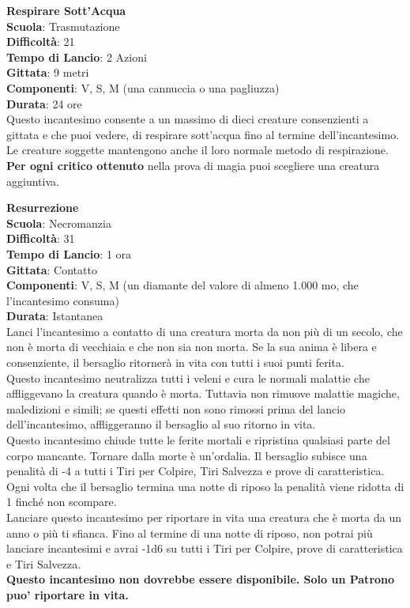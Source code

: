 \begin{multicols}{2}
\medskip\textbf{Respirare Sott'Acqua}\\
\textbf{Scuola}: Trasmutazione\\
\textbf{Difficoltà}: 21\\
\textbf{Tempo di Lancio}: 2 Azioni\\
\textbf{Gittata}: 9 metri\\
\textbf{Componenti}: V, S, M (una cannuccia o una pagliuzza)\\
\textbf{Durata}: 24 ore\\
Questo incantesimo consente a un massimo di dieci creature consenzienti a gittata e che puoi vedere, di respirare sott'acqua fino al termine dell'incantesimo. Le creature soggette mantengono anche il loro normale metodo di respirazione.\\
\textbf{Per ogni critico ottenuto} nella prova di magia puoi scegliere una creatura aggiuntiva.

\medskip\textbf{Resurrezione}\\
\textbf{Scuola}: Necromanzia\\
\textbf{Difficoltà}: 31\\
\textbf{Tempo di Lancio}: 1 ora\\
\textbf{Gittata}: Contatto\\
\textbf{Componenti}: V, S, M (un diamante del valore di almeno 1.000 mo, che l'incantesimo consuma)\\
\textbf{Durata}: Istantanea\\
Lanci l'incantesimo a contatto di una creatura morta da non più di un secolo, che non è morta di vecchiaia e che non sia non morta. Se la sua anima è libera e consenziente, il bersaglio ritornerà in vita con tutti i suoi punti ferita.\\
Questo incantesimo neutralizza tutti i veleni e cura le normali malattie che affliggevano la creatura quando è morta. Tuttavia non rimuove malattie magiche, maledizioni e simili; se questi effetti non sono rimossi prima del lancio dell'incantesimo, affliggeranno il bersaglio al suo ritorno in vita.\\
Questo incantesimo chiude tutte le ferite mortali e ripristina qualsiasi parte del corpo mancante. Tornare dalla morte è un'ordalia. Il bersaglio subisce una penalità di -4 a tutti i Tiri per Colpire, Tiri Salvezza e prove di caratteristica. Ogni volta che il bersaglio termina una notte di riposo la penalità viene ridotta di 1 finché non scompare.\\
Lanciare questo incantesimo per riportare in vita una creatura che è morta da un anno o più ti sfianca. Fino al termine di una notte di riposo, non potrai più lanciare incantesimi e avrai -1d6 su tutti i Tiri per Colpire, prove di caratteristica e Tiri Salvezza.\\
\textbf{Questo incantesimo non dovrebbe essere disponibile. Solo un Patrono puo' riportare in vita.}


\end{multicols}
